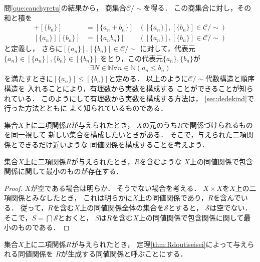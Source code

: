    問\ref{que:cauchyretu}の結果から，
   商集合$\mathcal{C} / {\sim}$を得る．
   この商集合に対し，その和と積を
   \begin{align}
     [\{a_n\}] + [\{b_n\}] & = [\{a_n+b_n\}]
                           & \left( [\{a_n\}] , [\{b_n\}] 
   \in \mathcal{C}/ {\sim} \right)
     \label{eq:cauchywa} \\
     [\{a_n\}] [\{b_n\}] & = [\{a_nb_n\}]
                         & \left( [\{a_n\}] , [\{b_n\}] 
   \in \mathcal{C}/ {\sim} \right)
     \label{eq:cauchyseki}
   \end{align}
   と定義し，
   さらに$[\{a_n\}] , [\{b_n\}] \in \mathcal{C} / {\sim}$
   に対して，代表元$\{a_n\} \in [\{a_n\}], \{b_n\} \in [\{b_n\}]$
   をとり，この代表元$\{a_n\},\{b_n\}$が
   \begin{align}
     \exists N \in \mathbb{N} \forall n \in \mathbb{N}
     (a_n \leq b_n )
     \label{eq:cauchyjunjo}
   \end{align}
   を満たすときに$[\{a_n\}] \leq [\{b_n\}]$と定める．
   以上のように$\mathcal{C} / {\sim}$代数構造と順序構造を
   入れることにより，有理数から実数を構成する
   ことができることが知られている．
   このようにして有理数から実数を構成する方法は，
   \ref{sec:dedekind}で行った方法とともに
   よく知られているものである．



   集合$X$上に二項関係$R$が与えられたとき，
   $X$の元のうち$R$で関係づけられるものを同一視して
   新しい集合を構成したいときがある．
   そこで，与えられた二項関係とできるだけ近いような
   同値関係を構成することを考えよう．

   \begin{thm} \label{thm:Rdoutiseisei}
     集合$X$上に二項関係$R$が与えられたとき，$R$を含むような
     $X$上の同値関係で包含関係に関して最小のものが存在する．
   \end{thm}
   \begin{proof}
     $X$が空である場合は明らか．
     そうでない場合を考える．
     $X \times X$を$X$上の二項関係とみなしたとき，
     これは明らかに$X$上の同値関係であり，$R$を含んでいる．
     従って，$R$を含む$X$上の同値関係全体の集合を$\mathscr{S}$とすると，
     $\mathscr{S}$は空でない．そこで，$S= \bigcap \mathscr{S}$とおくと，
     $S$は$R$を含む$X$上の同値関係で包含関係に関して最小のものである．
   \end{proof}

   集合$X$上に二項関係$R$が与えられたとき，
   定理\ref{thm:Rdoutiseisei}によって与えられる同値関係を
   $R$が生成する同値関係と呼ぶことにする．

